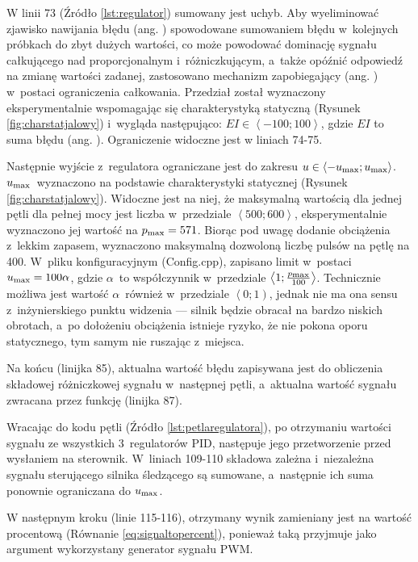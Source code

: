 W linii 73 (Źródło \ref{lst:regulator}) sumowany jest uchyb. Aby wyeliminować zjawisko nawijania błędu (ang. ) spowodowane sumowaniem błędu w~kolejnych próbkach do zbyt dużych wartości, co może powodować dominację sygnału całkującego nad proporcjonalnym i~różniczkującym, a~także opóźnić odpowiedź na zmianę wartości zadanej, zastosowano mechanizm zapobiegający (ang. ) w~postaci ograniczenia całkowania. Przedział został wyznaczony eksperymentalnie wspomagając się charakterystyką statyczną (Rysunek \ref{fig:charstatjalowy}) i~wygląda następująco: $EI \in \left<-100; 100\right>$, gdzie $EI$ to suma błędu (ang. ). Ograniczenie widoczne jest w liniach 74-75.

Następnie wyjście z~regulatora ograniczane jest do zakresu $u \in \left<-u\textsubscript{max}; u\textsubscript{max}\right>$. $u\textsubscript{max}$~wyznaczono na podstawie charakterystyki statycznej (Rysunek \ref{fig:charstatjalowy}). Widoczne jest na niej, że maksymalną wartością dla jednej pętli dla pełnej mocy jest liczba w~przedziale $\left<500; 600\right>$, eksperymentalnie wyznaczono jej wartość na $p\textsubscript{max}=571$. Biorąc pod uwagę dodanie obciążenia z~lekkim zapasem, wyznaczono maksymalną dozwoloną liczbę pulsów na pętlę na 400. W~pliku konfiguracyjnym (Config.cpp), zapisano limit w~postaci $u\textsubscript{max}=100\alpha$, gdzie $\alpha$~to współczynnik w~przedziale $\left<1; \frac{p\textsubscript{max}}{100}\right>$. Technicznie możliwa jest wartość $\alpha$~również w~przedziale $\left<0; 1\right)$, jednak nie ma ona sensu z~inżynierskiego punktu widzenia --- silnik będzie obracał na bardzo niskich obrotach, a~po dołożeniu obciążenia istnieje ryzyko, że nie pokona oporu statycznego, tym samym nie ruszając z~miejsca.

Na końcu (linijka 85), aktualna wartość błędu zapisywana jest do obliczenia składowej różniczkowej sygnału w~następnej pętli, a~aktualna wartość sygnału zwracana przez funkcję (linijka 87).

Wracając do kodu pętli (Źródło \ref{lst:petlaregulatora}), po otrzymaniu wartości sygnału ze wszystkich 3~regulatorów PID, następuje jego przetworzenie przed wysłaniem na sterownik. W~liniach 109-110 składowa zależna i~niezależna sygnału sterującego silnika śledzącego są sumowane, a~następnie ich suma ponownie ograniczana do $u\textsubscript{max}$.

W następnym kroku (linie 115-116), otrzymany wynik zamieniany jest na wartość procentową (Równanie \ref{eq:signaltopercent}), ponieważ taką przyjmuje jako argument wykorzystany generator sygnału PWM.


